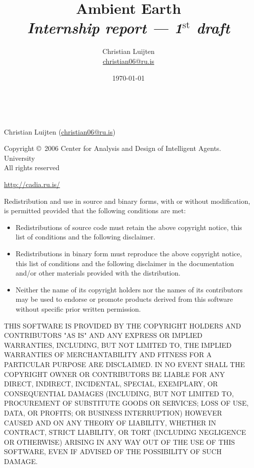 \documentclass[english,a4paper,twoside]{scrreprt}
\title{Ambient Earth\\
       {\Large \emph{Internship report --- 1$^{\text{st}}$ draft\/}}}
\author{Christian Luijten\\\url{christian06@ru.is}}
\date{\today}
\begin{document}

\maketitle

\mbox{} \\
\vfill

\begin{adjustwidth}{4em}{4em}
{\scriptsize
  Christian Luijten (\url{christian06@ru.is})

  Copyright \copyright\ 2006 Center for Analysis and Design of Intelligent
  Agents. \\
  \Rvk{} University \\
  All rights reserved

  \url{http://cadia.ru.is/}

  Redistribution and use in source and binary forms, with or without
  modification, is permitted provided that the following conditions are met:

  \begin{itemize}
    \item Redistributions of source code must retain the above copyright
      notice, this list of conditions and the following disclaimer.

    \item Redistributions in binary form must reproduce the above copyright
      notice, this list of conditions and the following disclaimer in the
      documentation and/or other materials provided with the distribution.

    \item Neither the name of its copyright holders nor the names of its
      contributors may be used to endorse or promote products derived from this
      software without specific prior written permission.

  \end{itemize}

  THIS SOFTWARE IS PROVIDED BY THE COPYRIGHT HOLDERS AND CONTRIBUTORS "AS IS"
  AND ANY EXPRESS OR IMPLIED WARRANTIES, INCLUDING, BUT NOT LIMITED TO, THE
  IMPLIED WARRANTIES OF MERCHANTABILITY AND FITNESS FOR A PARTICULAR PURPOSE
  ARE DISCLAIMED. IN NO EVENT SHALL THE COPYRIGHT OWNER OR CONTRIBUTORS BE
  LIABLE FOR ANY DIRECT, INDIRECT, INCIDENTAL, SPECIAL, EXEMPLARY, OR
  CONSEQUENTIAL DAMAGES (INCLUDING, BUT NOT LIMITED TO, PROCUREMENT OF
  SUBSTITUTE GOODS OR SERVICES; LOSS OF USE, DATA, OR PROFITS; OR BUSINESS
  INTERRUPTION) HOWEVER CAUSED AND ON ANY THEORY OF LIABILITY, WHETHER IN
  CONTRACT, STRICT LIABILITY, OR TORT (INCLUDING NEGLIGENCE OR OTHERWISE)
  ARISING IN ANY WAY OUT OF THE USE OF THIS SOFTWARE, EVEN IF ADVISED OF THE
  POSSIBILITY OF SUCH DAMAGE.
}
\end{adjustwidth}
\end{document}
